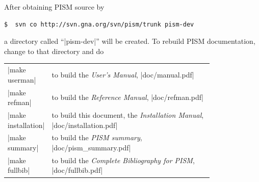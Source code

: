 \documentclass[11pt,final]{amsart}
\begin{document}
After obtaining PISM source by
\begin{verbatim}
$  svn co http://svn.gna.org/svn/pism/trunk pism-dev
\end{verbatim}
a directory called ``|pism-dev|'' will be created. To rebuild PISM documentation, change to that directory and do
\begin{center}
  \begin{tabular*}{0.9\linewidth}{lp{0.8\linewidth}}
    |make userman| & to build the \emph{User's Manual}, |doc/manual.pdf|\\
    |make refman| & to build the \emph{Reference Manual}, |doc/refman.pdf|\\
    |make installation| & to build this document, the \emph{Installation Manual}, |doc/installation.pdf|\\
    |make summary| & to build the \emph{PISM summary}, |doc/pism_summary.pdf|\\
    |make fullbib| & to build the \emph{Complete Bibliography for PISM}, |doc/fullbib.pdf|
  \end{tabular*}
\end{center}

\clearpage\newpage


\end{document}
